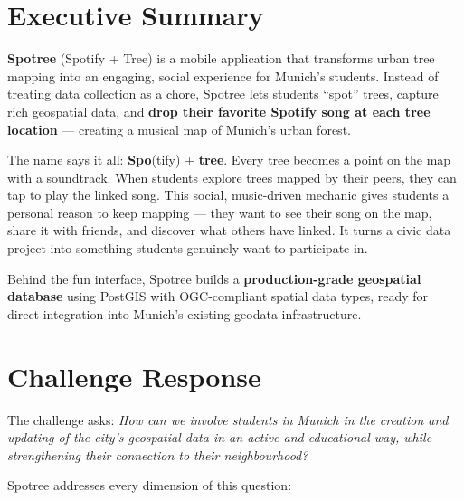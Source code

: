 \documentclass[11pt,a4paper]{article}
\begin{document}
\section{Executive Summary}

\textbf{Spotree} (Spotify + Tree) is a mobile application that transforms urban tree mapping into an engaging, social experience for Munich's students. Instead of treating data collection as a chore, Spotree lets students ``spot'' trees, capture rich geospatial data, and \textbf{drop their favorite Spotify song at each tree location} --- creating a musical map of Munich's urban forest.

The name says it all: \textbf{Spo}(tify) + \textbf{tree}. Every tree becomes a point on the map with a soundtrack. When students explore trees mapped by their peers, they can tap to play the linked song. This social, music-driven mechanic gives students a personal reason to keep mapping --- they want to see their song on the map, share it with friends, and discover what others have linked. It turns a civic data project into something students genuinely want to participate in.

Behind the fun interface, Spotree builds a \textbf{production-grade geospatial database} using PostGIS with OGC-compliant spatial data types, ready for direct integration into Munich's existing geodata infrastructure.

\section{Challenge Response}

The challenge asks: \textit{How can we involve students in Munich in the creation and updating of the city's geospatial data in an active and educational way, while strengthening their connection to their neighbourhood?}

Spotree addresses every dimension of this question:
\end{document}
